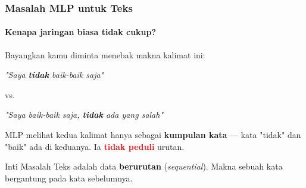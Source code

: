 \documentclass[t,aspectratio=169,xcolor=dvipsnames]{beamer}
\newcommand{\tem}[1]{\textbf{\textcolor{red}{#1}}}
\begin{document}
\begin{frame}
    \frametitle{Masalah MLP untuk Teks}
    \framesubtitle{Kenapa jaringan biasa tidak cukup?}
    \small
    Bayangkan kamu diminta menebak makna kalimat ini:
    \begin{center}
        \textit{"Saya \textbf{tidak} baik-baik saja"}
    \end{center}
    vs.
    \begin{center}
        \textit{"Saya baik-baik saja, \textbf{tidak} ada yang salah"}
    \end{center}

    \vspace{0.4em}
    MLP melihat kedua kalimat hanya sebagai \textbf{kumpulan kata} — kata "tidak" dan "baik" ada di keduanya. Ia \tem{tidak peduli} urutan.

    \vspace{0.3em}
    \begin{alertblock}{Inti Masalah}
        Teks adalah data \textbf{berurutan} (\textit{sequential}). Makna sebuah kata bergantung pada kata sebelumnya.
    \end{alertblock}
\end{frame}
\end{document}
